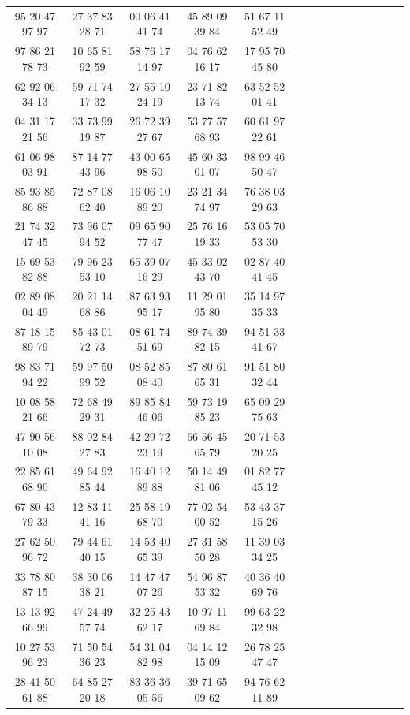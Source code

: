 \documentclass[lang=cn,10pt]{elegantbook}
\begin{document}
\begin{longtable}{ccccccccccccccc}
    95 20 47 97 97 & 27 37 83 28 71 & 00 06 41 41 74 & 45 89 09 39 84 & 51 67 11 52 49 \\
    97 86 21 78 73 & 10 65 81 92 59 & 58 76 17 14 97 & 04 76 62 16 17 & 17 95 70 45 80 \\
    62 92 06 34 13 & 59 71 74 17 32 & 27 55 10 24 19 & 23 71 82 13 74 & 63 52 52 01 41 \\
    04 31 17 21 56 & 33 73 99 19 87 & 26 72 39 27 67 & 53 77 57 68 93 & 60 61 97 22 61 \\
    61 06 98 03 91 & 87 14 77 43 96 & 43 00 65 98 50 & 45 60 33 01 07 & 98 99 46 50 47 \\
    85 93 85 86 88 & 72 87 08 62 40 & 16 06 10 89 20 & 23 21 34 74 97 & 76 38 03 29 63 \\
    21 74 32 47 45 & 73 96 07 94 52 & 09 65 90 77 47 & 25 76 16 19 33 & 53 05 70 53 30 \\
    15 69 53 82 88 & 79 96 23 53 10 & 65 39 07 16 29 & 45 33 02 43 70 & 02 87 40 41 45 \\
    02 89 08 04 49 & 20 21 14 68 86 & 87 63 93 95 17 & 11 29 01 95 80 & 35 14 97 35 33 \\
    87 18 15 89 79 & 85 43 01 72 73 & 08 61 74 51 69 & 89 74 39 82 15 & 94 51 33 41 67 \\
    98 83 71 94 22 & 59 97 50 99 52 & 08 52 85 08 40 & 87 80 61 65 31 & 91 51 80 32 44 \\
    10 08 58 21 66 & 72 68 49 29 31 & 89 85 84 46 06 & 59 73 19 85 23 & 65 09 29 75 63 \\
    47 90 56 10 08 & 88 02 84 27 83 & 42 29 72 23 19 & 66 56 45 65 79 & 20 71 53 20 25 \\
    22 85 61 68 90 & 49 64 92 85 44 & 16 40 12 89 88 & 50 14 49 81 06 & 01 82 77 45 12 \\
    67 80 43 79 33 & 12 83 11 41 16 & 25 58 19 68 70 & 77 02 54 00 52 & 53 43 37 15 26 \\
    27 62 50 96 72 & 79 44 61 40 15 & 14 53 40 65 39 & 27 31 58 50 28 & 11 39 03 34 25 \\
    33 78 80 87 15 & 38 30 06 38 21 & 14 47 47 07 26 & 54 96 87 53 32 & 40 36 40 69 76 \\
    13 13 92 66 99 & 47 24 49 57 74 & 32 25 43 62 17 & 10 97 11 69 84 & 99 63 22 32 98 \\
    10 27 53 96 23 & 71 50 54 36 23 & 54 31 04 82 98 & 04 14 12 15 09 & 26 78 25 47 47 \\
    28 41 50 61 88 & 64 85 27 20 18 & 83 36 36 05 56 & 39 71 65 09 62 & 94 76 62 11 89 \\

\end{longtable}
\end{document}
